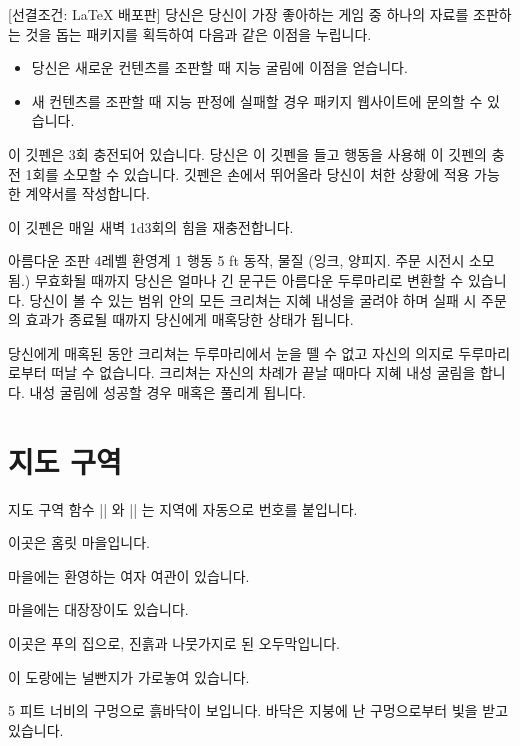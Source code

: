 \documentclass[letterpaper,twocolumn,openany,nodeprecatedcode]{dndbook-ko}
\begin{document}
[선결조건: \LaTeX{} 배포판]
당신은 당신이 가장 좋아하는 게임 중 하나의 자료를 조판하는 것을 돕는 패키지를 획득하여 다음과 같은 이점을 누립니다.
\begin{itemize}
  \item 당신은 새로운 컨텐츠를 조판할 때 지능 굴림에 이점을 얻습니다.
  \item 새 컨텐츠를 조판할 때 지능 판정에 실패할 경우 패키지 웹사이트에 문의할 수 있습니다.
\end{itemize}


이 깃펜은 3회 충전되어 있습니다. 당신은 이 깃펜을 들고 행동을 사용해 이 깃펜의 충전 1회를 소모할 수 있습니다. 깃펜은 손에서 뛰어올라 당신이 처한 상황에 적용 가능한 계약서를 작성합니다.

이 깃펜은 매일 새벽 1d3회의 힘을 재충전합니다.

\DndSpellHeader%
  {아름다운 조판 }
  {4레벨 환영계}
  {1 행동}
  {5 ft}
  {동작, 물질 (잉크, 양피지. 주문 시전시 소모됨.)}
  {무효화될 때까지}
당신은 얼마나 긴 문구든 아름다운 두루마리로 변환할 수 있습니다. 당신이 볼 수 있는 범위 안의 모든 크리쳐는 지혜 내성을 굴려야 하며 실패 시 주문의 효과가 종료될 때까지 당신에게 매혹당한 상태가 됩니다.

당신에게 매혹된 동안 크리쳐는 두루마리에서 눈을 뗄 수 없고 자신의 의지로 두루마리로부터 떠날 수 없습니다. 크리쳐는 자신의 차례가 끝날 때마다 지혜 내성 굴림을 합니다. 내성 굴림에 성공할 경우 매혹은 풀리게 됩니다.

\section{지도 구역 }
지도 구역 함수 |\DndArea| 와 |\DndSubArea| 는 지역에 자동으로 번호를 붙입니다.

이곳은 홈릿 마을입니다.

마을에는 환영하는 여자 여관이 있습니다.

마을에는 대장장이도 있습니다.

이곳은 푸의 집으로, 진흙과 나뭇가지로 된 오두막입니다.

이 도랑에는 널빤지가 가로놓여 있습니다.

5 피트 너비의 구멍으로 흙바닥이 보입니다. 바닥은 지붕에 난 구멍으로부터 빛을 받고 있습니다.
\end{document}
